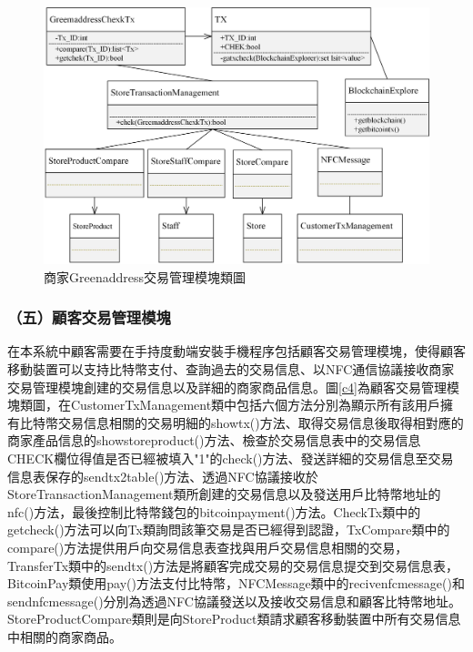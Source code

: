 	

	\begin{figure}[!htbp]
		\centering
		\includegraphics[width = 1\textwidth]{c7.jpg}
		\caption{商家Greenaddress交易管理模塊類圖}\label{c7}
	\end{figure}



\subsubsection{（五）顧客交易管理模塊}
在本系統中顧客需要在手持度動端安裝手機程序包括顧客交易管理模塊，使得顧客移動裝置可以支持比特幣支付、查詢過去的交易信息、以NFC通信協議接收商家交易管理模塊創建的交易信息以及詳細的商家商品信息。圖\ref{c4}為顧客交易管理模塊類圖，在CustomerTxManagement類中包括六個方法分別為顯示所有該用戶擁有比特幣交易信息相關的交易明細的showtx()方法、取得交易信息後取得相對應的商家產品信息的showstoreproduct()方法、檢查於交易信息表中的交易信息CHECK欄位得值是否已經被填入"1"的check()方法、發送詳細的交易信息至交易信息表保存的sendtx2table()方法、透過NFC協議接收於StoreTransactionManagement類所創建的交易信息以及發送用戶比特幣地址的nfc()方法，最後控制比特幣錢包的bitcoinpayment()方法。CheckTx類中的getcheck()方法可以向Tx類詢問該筆交易是否已經得到認證，TxCompare類中的compare()方法提供用戶向交易信息表查找與用戶交易信息相關的交易，TransferTx類中的sendtx()方法是將顧客完成交易的交易信息提交到交易信息表，BitcoinPay類使用pay()方法支付比特幣，NFCMessage類中的recivenfcmessage()和sendnfcmessage()分別為透過NFC協議發送以及接收交易信息和顧客比特幣地址。StoreProductCompare類則是向StoreProduct類請求顧客移動裝置中所有交易信息中相關的商家商品。

